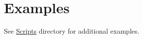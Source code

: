 \section{Examples}
See \href{https://github.com/VladimirMakeev/D2ModdingToolset/tree/master/Scripts}{Scripts} directory for additional examples.

\newpage

\newpage

\newpage

\newpage

\newpage

\newpage

\newpage

\newpage